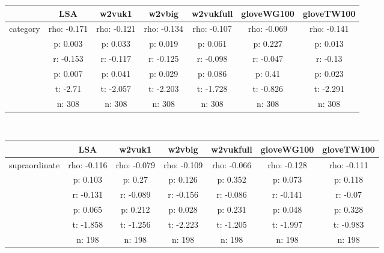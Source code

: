 \documentclass{article}
\begin{document}
\begin{tabular}{ccccccc|}\cline{2-7}
&\multicolumn{1}{|c}{LSA} & w2vuk1 & w2vbig & w2vukfull & gloveWG100 & gloveTW100 \\\hline
\multicolumn{1}{|c|}{\multirow{6}{*}{category}} & rho: -0.171 & rho: -0.121 & rho: -0.134 & rho: -0.107 & rho: -0.069 & rho: -0.141 \\
\multicolumn{1}{|c|}{} & p: 0.003 & p: 0.033 & p: 0.019 & p: 0.061 & p: 0.227 & p: 0.013 \\
\multicolumn{1}{|c|}{} & r: -0.153 & r: -0.117 & r: -0.125 & r: -0.098 & r: -0.047 & r: -0.13 \\
\multicolumn{1}{|c|}{} & p: 0.007 & p: 0.041 & p: 0.029 & p: 0.086 & p: 0.41 & p: 0.023 \\
\multicolumn{1}{|c|}{} & t: -2.71 & t: -2.057 & t: -2.203 & t: -1.728 & t: -0.826 & t: -2.291 \\
\multicolumn{1}{|c|}{} & n: 308 & n: 308 & n: 308 & n: 308 & n: 308 & n: 308 \\
\hline
\end{tabular}\\
\begin{tabular}{ccccccc|}\cline{2-7}
&\multicolumn{1}{|c}{LSA} & w2vuk1 & w2vbig & w2vukfull & gloveWG100 & gloveTW100 \\\hline
\multicolumn{1}{|c|}{\multirow{6}{*}{supraordinate}} & rho: -0.116 & rho: -0.079 & rho: -0.109 & rho: -0.066 & rho: -0.128 & rho: -0.111 \\
\multicolumn{1}{|c|}{} & p: 0.103 & p: 0.27 & p: 0.126 & p: 0.352 & p: 0.073 & p: 0.118 \\
\multicolumn{1}{|c|}{} & r: -0.131 & r: -0.089 & r: -0.156 & r: -0.086 & r: -0.141 & r: -0.07 \\
\multicolumn{1}{|c|}{} & p: 0.065 & p: 0.212 & p: 0.028 & p: 0.231 & p: 0.048 & p: 0.328 \\
\multicolumn{1}{|c|}{} & t: -1.858 & t: -1.256 & t: -2.223 & t: -1.205 & t: -1.997 & t: -0.983 \\
\multicolumn{1}{|c|}{} & n: 198 & n: 198 & n: 198 & n: 198 & n: 198 & n: 198 \\
\hline
\end{tabular}\\
\end{document}
